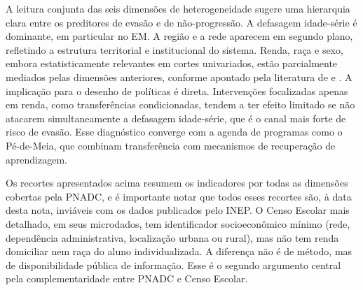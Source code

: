 A leitura conjunta das seis dimensões de heterogeneidade
sugere uma hierarquia clara entre os preditores de evasão e de
não-progressão. A defasagem idade-série é dominante, em
particular no EM. A região e a rede aparecem em segundo plano,
refletindo a estrutura territorial e institucional do sistema.
Renda, raça e sexo, embora estatisticamente relevantes em
cortes univariados, estão parcialmente mediados pelas
dimensões anteriores, conforme apontado pela literatura de
\citet{SoaresAlvesFonseca2021_trajetorias} e
\citet{AlvesSoares2013_contexto}. A implicação para o desenho
de políticas é direta. Intervenções focalizadas apenas em
renda, como transferências condicionadas, tendem a ter efeito
limitado se não atacarem simultaneamente a defasagem
idade-série, que é o canal mais forte de risco de evasão. Esse
diagnóstico converge com a agenda de programas como o
Pé-de-Meia, que combinam transferência com mecanismos de
recuperação de aprendizagem.

Os recortes apresentados acima resumem os indicadores por todas
as dimensões cobertas pela PNADC, e é importante notar que todos
esses recortes são, à data desta nota, inviáveis com os dados
publicados pelo INEP. O Censo Escolar mais detalhado, em seus
microdados, tem identificador socioeconômico mínimo (rede,
dependência administrativa, localização urbana ou rural), mas
não tem renda domiciliar nem raça do aluno individualizada. A
diferença não é de método, mas de disponibilidade pública de
informação. Esse é o segundo argumento central pela
complementaridade entre PNADC e Censo Escolar.
